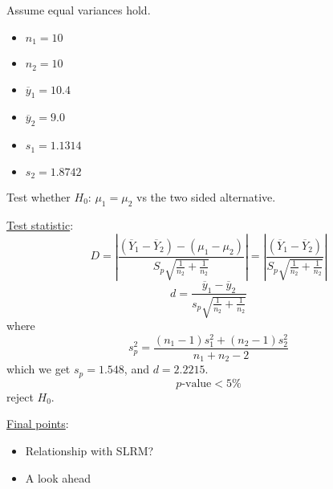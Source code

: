 \begin{exbox}
    \begin{example} Assume equal variances hold.
        \begin{itemize}
            \item $ n_1=10 $
            \item $ n_2=10 $
            \item $ \overline{y}_1=10.4 $
            \item $ \overline{y}_2=9.0 $
            \item $ s_1=1.1314 $
            \item $ s_2=1.8742 $
        \end{itemize}
        Test whether $ H_0 $: $ \mu_1=\mu_2 $ vs the two sided alternative.

        \underline{Test statistic}:
        \[ D=\left|\frac{(\overline{Y}_1-\overline{Y}_2)-(\mu_1-\mu_2)}{S_p\sqrt{\frac{1}{n_2}+\frac{1}{n_2}}}\right|=
            \left|\frac{(\overline{Y}_1-\overline{Y}_2)}{S_p\sqrt{\frac{1}{n_2}+\frac{1}{n_2}}}\right| \]
        \[ d=\frac{\overline{y}_1-\overline{y}_2}{s_p\sqrt{\frac{1}{n_2}+\frac{1}{n_2}}} \]
        where
        \[ s_p^2=\frac{(n_1-1)s_1^2+(n_2-1)s_2^2}{n_1+n_2-2} \]
        which we get $ s_p=1.548 $, and $ d=2.2215 $.
        \[ p\text{-value}<5\% \]
        reject $ H_0 $.
    \end{example}
\end{exbox}

\underline{Final points}:
\begin{itemize}
    \item Relationship with SLRM?
    \item A look ahead
\end{itemize}
